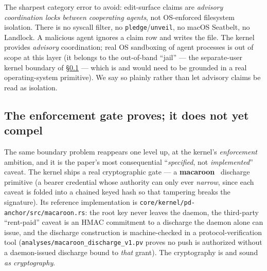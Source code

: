 \documentclass[11pt,a4paper]{article}
\theoremstyle{definition}
\theoremstyle{remark}
\begin{document}
The sharpest category error to avoid: edit-surface claims are \emph{advisory
coordination locks between cooperating agents}, not OS-enforced filesystem
isolation. There is no syscall filter, no \texttt{pledge}/\texttt{unveil}, no macOS
Seatbelt, no Landlock. A malicious agent ignores a claim row and writes the file.
The kernel provides \emph{advisory} coordination; real OS sandboxing of agent
processes is out of scope at this layer (it belongs to the out-of-band
``jail'' --- the separate-user kernel boundary of \S\ref{sec:enforcement-gap} ---
which is \Vision{} and would need to be grounded in a real operating-system
primitive). We say so plainly rather than let advisory claims be read as isolation.

\subsection{The enforcement gate proves; it does not yet compel}
\label{sec:enforcement-gap}

The same boundary problem reappears one level up, at the kernel's
\emph{enforcement} ambition, and it is the paper's most consequential
``\emph{specified}, not \emph{implemented}'' caveat. The kernel ships a real
cryptographic gate --- a \textbf{macaroon}~ discharge
primitive (a bearer credential whose authority can only ever \emph{narrow}, since
each caveat is folded into a chained keyed hash so that tampering breaks the
signature). Its reference implementation is \texttt{core/kernel/pd-anchor/src/macaroon.rs}:
the root key never leaves the daemon, the third-party ``rent-paid'' caveat is an
HMAC commitment to a discharge the daemon alone can issue, and the discharge
construction is machine-checked in a protocol-verification tool
(\texttt{analyses/macaroon\_discharge\_v1.pv} proves no push is authorized without
a daemon-issued discharge bound to \emph{that} grant). The cryptography is
\Built{} and sound \emph{as cryptography}.

\end{document}
